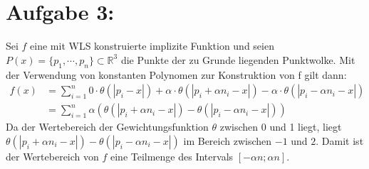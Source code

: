 \newpage
\section*{Aufgabe 3: }
Sei $f$ eine mit WLS konstruierte implizite Funktion und seien $P(x) = \{p_1, \cdots, p_n\} \subset \mathbb{R}^3$ die Punkte der zu Grunde liegenden Punktwolke.
Mit der Verwendung von konstanten Polynomen zur Konstruktion von f gilt dann:
\begin{align*}
  f(x) &= \sum_{i=1}^n 0 \cdot \theta(|p_i - x|) + \alpha \cdot \theta(|p_i + \alpha n_i - x|) - \alpha \cdot \theta(|p_i - \alpha n_i - x|)\\
  &= \sum_{i=1}^n \alpha (\theta(|p_i + \alpha n_i - x|) - \theta(|p_i - \alpha n_i - x|))
\end{align*}
Da der Wertebereich der Gewichtungsfunktion $\theta$ zwischen 0 und 1 liegt, liegt $\theta(|p_i + \alpha n_i - x|) - \theta(|p_i - \alpha n_i - x|)$ im Bereich zwischen $-1$ und $2$. Damit ist der Wertebereich von $f$ eine Teilmenge des Intervals $[-\alpha n; \alpha n]$.